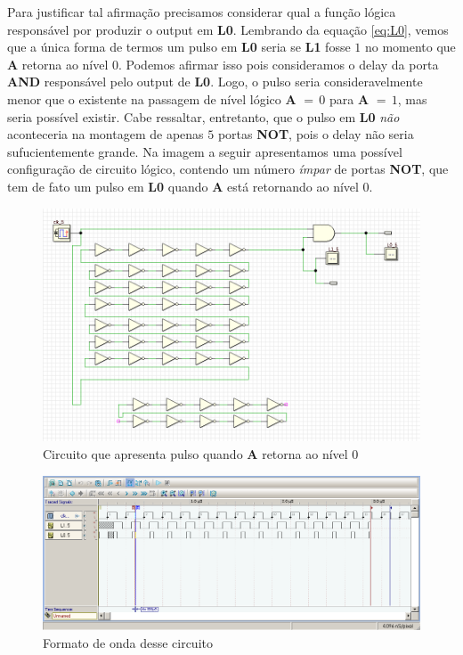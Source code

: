 \documentclass[12pt]{article}
\begin{document}
Para justificar tal afirmação precisamos considerar qual a função lógica
responsável por produzir o output em \textbf{L0}. Lembrando da equação
\ref{eq:L0}, vemos que a única forma de termos um pulso em \textbf{L0} seria se
\textbf{L1} fosse $1$ no momento que \textbf{A} retorna ao nível $0$. Podemos
afirmar isso pois consideramos o delay da porta \textbf{AND} responsável pelo
output de \textbf{L0}. Logo, o pulso seria consideravelmente menor que o
existente na passagem de nível lógico \textbf{A} $= \, 0$ para \textbf{A}
$= \, 1$, mas seria possível existir. Cabe ressaltar, entretanto, que o pulso em
\textbf{L0} \emph{não} aconteceria na montagem de apenas $5$ portas
\textbf{NOT}, pois o delay não seria sufucientemente grande. Na imagem a seguir
apresentamos uma possível configuração de circuito lógico, contendo um número
\emph{ímpar} de portas \textbf{NOT}, que tem de fato um pulso em \textbf{L0}
quando \textbf{A} está retornando ao nível $0$.

\begin{figure}[H]
    \centering
    \includegraphics[width=.9\textwidth]{Exp04/exp4_2.0_d_clk_circuito_ao_voltar_para_zero.png}
    \caption{Circuito que apresenta pulso quando \textbf{A} retorna ao nível 0}\label{fig:exp4_2.0_d_clk_circuito_ao_voltar_para_zero.png}
\end{figure}

\begin{figure}[H]
    \centering
    \includegraphics[width=.9\textwidth]{Exp04/exp4_2.0_d_clk_wave_ao_voltar_para_zero.png}
    \caption{Formato de onda desse circuito}\label{fig:exp4_2.0_d_clk_wave_ao_voltar_para_zero.png}
\end{figure}
\end{document}
